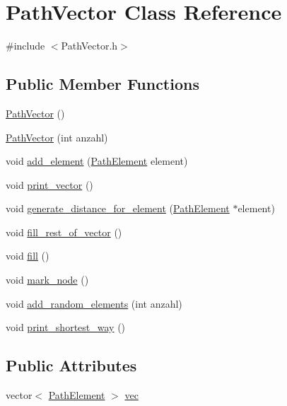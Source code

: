 \hypertarget{class_path_vector}{\section{Path\-Vector Class Reference}
\label{class_path_vector}
}


{\ttfamily \#include $<$Path\-Vector.\-h$>$}

\subsection*{Public Member Functions}
\begin{DoxyCompactItemize}
\item 
\hyperlink{class_path_vector_afa70976329b343c5c895fc47bf82c0d6}{Path\-Vector} ()
\item 
\hyperlink{class_path_vector_aed0c95496f2511bb7a9c0b892fa69ba0}{Path\-Vector} (int anzahl)
\item 
void \hyperlink{class_path_vector_afdd17b2b88b5f4a0a7d4641da0454735}{add\-\_\-element} (\hyperlink{class_path_element}{Path\-Element} element)
\item 
void \hyperlink{class_path_vector_a2aa921992eff4bcd247c42114440d017}{print\-\_\-vector} ()
\item 
void \hyperlink{class_path_vector_a4737f2df91d54c72a297d9fc825d852e}{generate\-\_\-distance\-\_\-for\-\_\-element} (\hyperlink{class_path_element}{Path\-Element} $\ast$element)
\item 
void \hyperlink{class_path_vector_a063b30351ed6e843378b68a38d8dc42b}{fill\-\_\-rest\-\_\-of\-\_\-vector} ()
\item 
void \hyperlink{class_path_vector_ab631465f00988508a622739f9968fe68}{fill} ()
\item 
void \hyperlink{class_path_vector_a07947bd5c4737b372e122e77d35128ee}{mark\-\_\-node} ()
\item 
void \hyperlink{class_path_vector_a162d1e373ac1cbdef8a3d33c3d3e3bd5}{add\-\_\-random\-\_\-elements} (int anzahl)
\item 
void \hyperlink{class_path_vector_a852a1f8748c4a2701f00716b71607076}{print\-\_\-shortest\-\_\-way} ()
\end{DoxyCompactItemize}
\subsection*{Public Attributes}
\begin{DoxyCompactItemize}
\item 
vector$<$ \hyperlink{class_path_element}{Path\-Element} $>$ \hyperlink{class_path_vector_a5d5208960d438c76fd2ee08efb29b1ee}{vec}
\end{DoxyCompactItemize}


